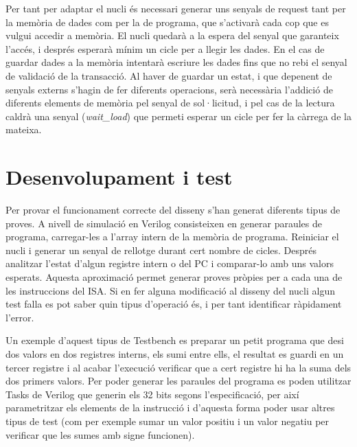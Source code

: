 \documentclass[10pt,a4paper,twocolumn,twoside]{article}
\begin{document}
    Per tant per adaptar el nucli és necessari generar uns senyals de request tant per la memòria de dades com per la de programa, que s'activarà cada cop que es vulgui accedir a memòria. El nucli quedarà a la espera del senyal que garanteix l'accés, i després esperarà mínim un cicle per a llegir les dades. En el cas de guardar dades a la memòria  intentarà escriure les dades fins que no rebi el senyal de validació de la transacció.
    Al haver de guardar un estat, i que depenent de senyals externs s’hagin de fer diferents operacions, serà necessària l’addició de diferents elements de memòria pel senyal de sol·licitud, i pel cas de la lectura caldrà una senyal (\textit{wait\_load}) que permeti esperar un cicle per fer la càrrega de la mateixa. 

    
        
        


\section{Desenvolupament i test}
\label{sec:Test}

Per provar el funcionament correcte del disseny s'han generat diferents tipus de proves.
A nivell de simulació en Verilog consisteixen en generar paraules de programa, carregar-les a l'array intern de la memòria de programa. Reiniciar el nucli i generar un senyal de rellotge durant cert nombre de cicles. Després analitzar l'estat d'algun registre intern o del PC i comparar-lo amb uns valors esperats. Aquesta aproximació permet generar proves pròpies per a cada una de les instruccions del ISA. Si en fer alguna modificació al disseny del nucli algun test falla es pot saber quin tipus d'operació és, i per tant identificar ràpidament l'error.

Un exemple d'aquest tipus de Testbench es preparar un petit programa que desi dos valors en dos registres interns, els sumi entre ells, el resultat es guardi en un tercer registre i al acabar l'execució verificar que a cert registre hi ha la suma dels dos primers valors. Per poder generar les paraules del programa es poden utilitzar Tasks de Verilog que generin els 32 bits segons l'especificació, per així parametritzar els elements de la instrucció i d'aquesta forma poder usar altres tipus de test (com per exemple sumar un valor positiu i un valor negatiu per verificar que les sumes amb signe funcionen). 
\end{document}
